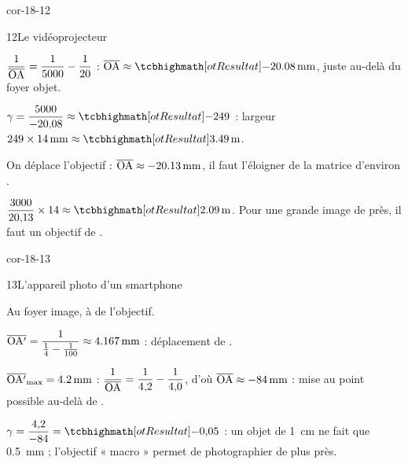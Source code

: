 \begin{blocLivre}{cor-18-12}
\begin{corrige}{12}{Le vidéoprojecteur}
\begin{questions}
\item $\dfrac{1}{\overline{\mathrm{OA}}}=\dfrac{1}{5000}-\dfrac{1}{20}$ : $\alg{OA}\approx\res{\qty{-20,08}{mm}}$, juste au-delà du foyer objet.
\item $\gamma=\dfrac{5000}{-20{,}08}\approx\res{-249}$ : largeur $249\times\qty{14}{mm}\approx\res{\qty{3,49}{m}}$.
\item On déplace l'objectif : $\overline{\mathrm{OA}}\approx\qty{-20,13}{mm}$, il faut l'éloigner de la matrice d'environ .
\item $\dfrac{3000}{20{,}13}\times14\approx\res{\qty{2,09}{m}}$. Pour une grande image de près, il faut un objectif de .
\end{questions}
\end{corrige}
\end{blocLivre}
\begin{blocLivre}{cor-18-13}
\begin{corrige}{13}{L'appareil photo d'un smartphone}
\begin{questions}
\item Au foyer image, à  de l'objectif.
\item $\overline{\mathrm{OA'}}=\dfrac{1}{\frac{1}{4}-\frac{1}{100}}\approx\qty{4,167}{mm}$ : déplacement de .
\item $\overline{\mathrm{OA'}}_\mathrm{max}=\qty{4,2}{mm}$ : $\dfrac{1}{\overline{\mathrm{OA}}}=\dfrac{1}{4{,}2}-\dfrac{1}{4{,}0}$, d'où $\overline{\mathrm{OA}}\approx\qty{-84}{mm}$ : mise au point possible au-delà de .
\item $\gamma=\dfrac{4{,}2}{-84}=\res{-0{,}05}$ : un objet de \qty{1}{cm} ne fait que \qty{0,5}{mm} ; l'objectif « macro » permet de photographier de plus près.
\end{questions}
\end{corrige}
\end{blocLivre}
